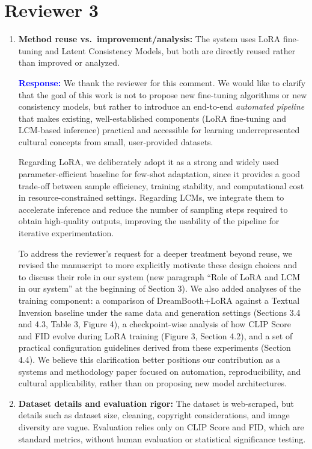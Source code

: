 \documentclass[11pt]{article}
\begin{document}
\section*{Reviewer 3}

\begin{enumerate}[label=\textbf{C\arabic*.}, leftmargin=*]
\item \textbf{Method reuse vs.\ improvement/analysis:} The system uses LoRA fine-tuning and Latent Consistency Models, but both are directly reused rather than improved or analyzed.

\textbf{\textcolor{blue}{Response:}} We thank the reviewer for this comment. We would like to clarify that the goal of this work is not to propose new fine-tuning algorithms or new consistency models, but rather to introduce an end-to-end \emph{automated pipeline} that makes existing, well-established components (LoRA fine-tuning and LCM-based inference) practical and accessible for learning underrepresented cultural concepts from small, user-provided datasets.

Regarding LoRA, we deliberately adopt it as a strong and widely used parameter-efficient baseline for few-shot adaptation, since it provides a good trade-off between sample efficiency, training stability, and computational cost in resource-constrained settings. Regarding LCMs, we integrate them to accelerate inference and reduce the number of sampling steps required to obtain high-quality outputs, improving the usability of the pipeline for iterative experimentation.

To address the reviewer’s request for a deeper treatment beyond reuse, we revised the manuscript to more explicitly motivate these design choices and to discuss their role in our system (new paragraph ``Role of LoRA and LCM in our system'' at the beginning of Section 3). We also added analyses of the training component: a comparison of DreamBooth+LoRA against a Textual Inversion baseline under the same data and generation settings (Sections 3.4 and 4.3, Table 3, Figure 4), a checkpoint-wise analysis of how CLIP Score and FID evolve during LoRA training (Figure 3, Section 4.2), and a set of practical configuration guidelines derived from these experiments (Section 4.4). We believe this clarification better positions our contribution as a systems and methodology paper focused on automation, reproducibility, and cultural applicability, rather than on proposing new model architectures.

\item \textbf{Dataset details and evaluation rigor:} The dataset is web-scraped, but details such as dataset size, cleaning, copyright considerations, and image diversity are vague. Evaluation relies only on CLIP Score and FID, which are standard metrics, without human evaluation or statistical significance testing.


\end{enumerate}
\end{document}
